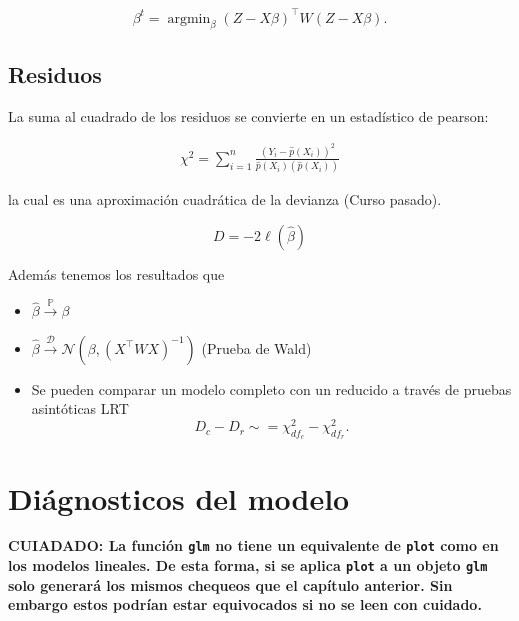 \documentclass[
  12pt,
]{book}
\providecommand{\tightlist}{%
  \setlength{\itemsep}{0pt}\setlength{\parskip}{0pt}}
\theoremstyle{definition}
\theoremstyle{definition}
\theoremstyle{definition}
\theoremstyle{remark}
\begin{document}
\begin{equation*}
\beta ^{t} = \operatorname{argmin}_{\beta} (Z-X\beta)^{\top}W(Z-X\beta).
\end{equation*}

\hypertarget{residuos}{%
\subsection{Residuos}\label{residuos}}

La suma al cuadrado de los residuos se convierte en un estadístico de pearson:

\begin{align*}
\chi^{2}=\sum_{i=1}^{n} \frac{\left(Y_{i}-\hat{p}(X_{i})\right)^{2}}{\hat{p}(X_{i})(\hat{p}(X_{i}))}
\end{align*}

la cual es una aproximación cuadrática de la devianza (Curso pasado).

\begin{equation*}
D = -2 \ell(\hat{\beta})
\end{equation*}

Además tenemos los resultados que

\begin{itemize}
\tightlist
\item
  \(\hat{\beta} \xrightarrow{\mathbb{P}} \beta\)
\item
  \(\hat{\beta} \xrightarrow{\mathcal{D}} \mathcal{N}\left(\beta,(X^{\top}WX)^{-1}\right)\) (Prueba de Wald)
\item
  Se pueden comparar un modelo completo con un reducido a través de pruebas asintóticas LRT
  \begin{equation*}
  D_c -D_r \sim =\chi^{2}_{df_{c}} - \chi^{2}_{df_{r}}.
  \end{equation*}
\end{itemize}

\hypertarget{diuxe1gnosticos-del-modelo}{%
\section{Diágnosticos del modelo}\label{diuxe1gnosticos-del-modelo}}

\textbf{CUIADADO: La función \texttt{glm} no tiene un equivalente de \texttt{plot} como en los modelos lineales. De esta forma, si se aplica \texttt{plot} a un objeto \texttt{glm} solo generará los mismos chequeos que el capítulo anterior. Sin embargo estos podrían estar equivocados si no se leen con cuidado.}
\end{document}
